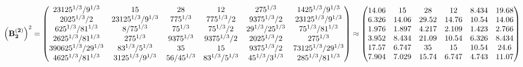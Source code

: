 \documentclass[10pt,a4paper]{article}
\begin{document}
	\[
		\left(\bold{B_2^{(2)}}\right)^{2} = 
		\begin{pmatrix}
			{{2}{3125^ {1 / 3}}} / {{9^ {1 / 3}}} & {{15}}{} & {{28}}{} & {{12}}{} & {{2}{75^ {1 / 3}}}{} & {{14}{25^ {1 / 3}}} / {{9^ {1 / 3}}} \\
			{{2025^ {1 / 3}}} / {{2}} & {{2}{3125^ {1 / 3}}} / {{9^ {1 / 3}}} & {{7}{75^ {1 / 3}}}{} & {{7}{75^ {1 / 3}}} / {{2}} & {{9375^ {1 / 3}}} / {{2}} & {{2}{3125^ {1 / 3}}} / {{9^ {1 / 3}}} \\
			{{625^ {1 / 3}}} / {{81^ {1 / 3}}} & {{8}} / {{75^ {1 / 3}}} & {{75^ {1 / 3}}}{} & {{75^ {1 / 3}}} / {{2}} & {{2}{9^ {1 / 3}}} / {{25^ {1 / 3}}} & {{7}{5^ {1 / 3}}} / {{81^ {1 / 3}}} \\
			{{2}{625^ {1 / 3}}} / {{81^ {1 / 3}}} & {{2}{75^ {1 / 3}}}{} & {{9375^ {1 / 3}}}{} & {{9375^ {1 / 3}}} / {{2}} & {{2025^ {1 / 3}}} / {{2}} & {{2}{75^ {1 / 3}}}{} \\
			{{390625^ {1 / 3}}} / {{2}{9^ {1 / 3}}} & {{8}{3^ {1 / 3}}} / {{5^ {1 / 3}}} & {{35}}{} & {{15}}{} & {{9375^ {1 / 3}}} / {{2}} & {{7}{3125^ {1 / 3}}} / {{2}{9^ {1 / 3}}} \\
			{{4}{625^ {1 / 3}}} / {{81^ {1 / 3}}} & {{3125^ {1 / 3}}} / {{9^ {1 / 3}}} & {{56}} / {{45^ {1 / 3}}} & {{8}{3^ {1 / 3}}} / {{5^ {1 / 3}}} & {{4}{5^ {1 / 3}}} / {{3^ {1 / 3}}} & {{28}{5^ {1 / 3}}} / {{81^ {1 / 3}}} \\
		\end{pmatrix}
		\approx
		\begin{pmatrix}
			14.06    & 15       & 28       & 12       & 8.434    & 19.68    \\
			6.326    & 14.06    & 29.52    & 14.76    & 10.54    & 14.06    \\
			1.976    & 1.897    & 4.217    & 2.109    & 1.423    & 2.766    \\
			3.952    & 8.434    & 21.09    & 10.54    & 6.326    & 8.434    \\
			17.57    & 6.747    & 35       & 15       & 10.54    & 24.6     \\
			7.904    & 7.029    & 15.74    & 6.747    & 4.743    & 11.07    \\
		\end{pmatrix}
	\]
\end{document}
